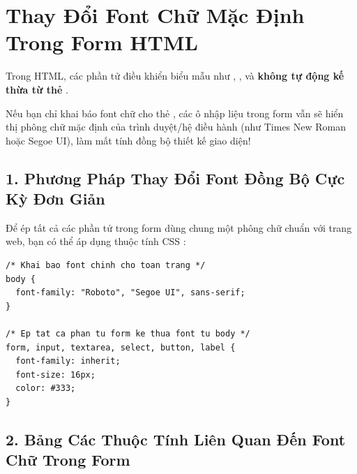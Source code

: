 \section{Thay Đổi Font Chữ Mặc Định Trong Form HTML}
\label{sec:form_font_customization}

\begin{conceptBox}
Trong HTML, các phần tử điều khiển biểu mẫu như , ,  và  \textbf{không tự động kế thừa  từ thẻ }.
\par\vspace{4pt}
Nếu bạn chỉ khai báo font chữ cho thẻ , các ô nhập liệu trong form vẫn sẽ hiển thị phông chữ mặc định của trình duyệt/hệ điều hành (như Times New Roman hoặc Segoe UI), làm mất tính đồng bộ thiết kế giao diện!
\end{conceptBox}

\subsection{1. Phương Pháp Thay Đổi Font Đồng Bộ Cực Kỳ Đơn Giản}
Để ép tất cả các phần tử trong form dùng chung một phông chữ chuẩn với trang web, bạn có thể áp dụng thuộc tính CSS :

\begin{codeWindow}
\begin{lstlisting}[language=HTML5]
/* Khai bao font chinh cho toan trang */
body {
  font-family: "Roboto", "Segoe UI", sans-serif;
}

/* Ep tat ca phan tu form ke thua font tu body */
form, input, textarea, select, button, label {
  font-family: inherit;
  font-size: 16px;
  color: #333;
}
\end{lstlisting}
\end{codeWindow}

\subsection{2. Bảng Các Thuộc Tính Liên Quan Đến Font Chữ Trong Form}

